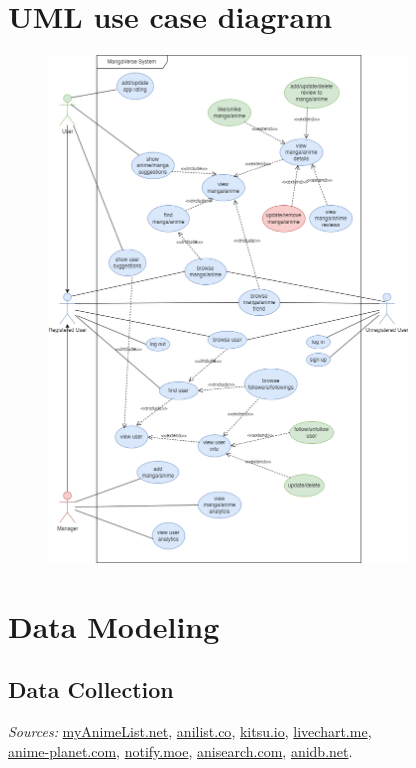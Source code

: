 \newpage

\section{UML use case diagram}

\begin{figure}[h]\label{uml use case diagram}
    \centering
    \includegraphics[width=0.85\textwidth]{Media/useCase.png}
\end{figure}

\newpage

\section{Data Modeling}

\subsection{Data Collection}

\textit{Sources:}
\href{https://myanimelist.net/}{myAnimeList.net}, 
\href{https://anilist.co/}{anilist.co},
\href{https://kitsu.io/}{kitsu.io},
\href{https://livechart.me/}{livechart.me}, \\
\href{https://anime-planet.com/}{anime-planet.com},
\href{https://notify.moe/}{notify.moe},
\href{https://anisearch.com/}{anisearch.com},
\href{https://anidb.net/}{anidb.net}.

